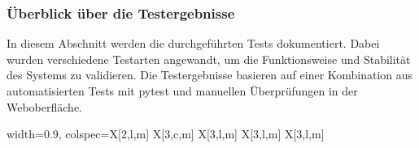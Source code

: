 \subsubsection{Überblick über die Testergebnisse}




In diesem Abschnitt werden die durchgeführten Tests dokumentiert.
Dabei wurden verschiedene Testarten angewandt, um die Funktionsweise und Stabilität des Systems zu validieren.
Die Testergebnisse basieren auf einer Kombination aus automatisierten Tests mit pytest und manuellen Überprüfungen in der Weboberfläche.

\footnotesize
\begin{center}
\begin{longtblr}[caption={Überblick über die Testergebnisse}, label={tab:testcases}]{width=0.9\textwidth, colspec={X[2,l,m] X[3,c,m] X[3,l,m] X[3,l,m] X[3,l,m]}}\toprule


\end{longtblr}
\end{center}
